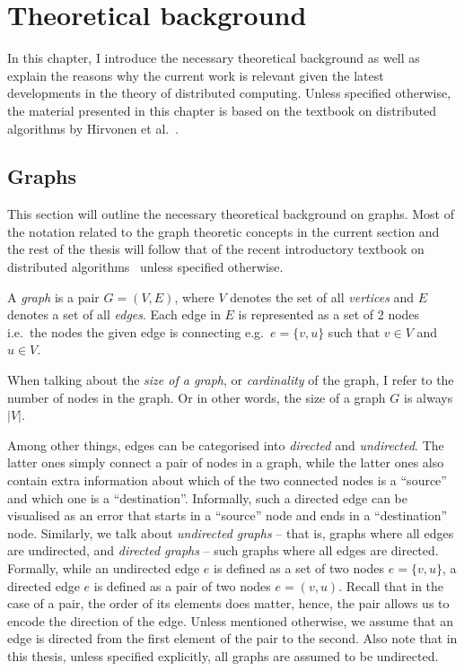 \chapter{Theoretical background}
\label{chapter:background}

In this chapter, I introduce the necessary theoretical background as well as
explain the reasons why the current work is relevant given the latest
developments in the theory of distributed computing. Unless specified otherwise,
the material presented in this chapter is based on the textbook on distributed algorithms by Hirvonen et al.~\cite{Hirvonen2020}.

\section{Graphs}

This section will outline the necessary theoretical background on graphs. 
Most of the notation related to the graph theoretic concepts in the current
section and the rest of the thesis will follow that of
the recent introductory textbook on distributed algorithms~\cite{Hirvonen2020}
unless specified otherwise.

A \emph{graph} is a pair $G = (V, E)$, where $V$ denotes the set of all \emph{vertices}
and $E$ denotes a set of all \emph{edges}. Each edge in $E$ is represented as a set of
2 nodes i.e.\ the nodes the given edge is connecting e.g.\ $e = \{v, u\}$ such that 
$v \in V$ and $u \in V$.

When talking about the \emph{size of a graph}, or \emph{cardinality} of the graph, I refer
to the number of nodes in the graph. Or in other words, the size of a graph $G$
is always $|V|$.

Among other things, edges can be categorised into \emph{directed} and \emph{undirected}.
The latter ones simply connect a pair of nodes in a graph, while the latter
ones also contain extra information about which of the two connected nodes is
a ``source'' and which one is a ``destination''. Informally, such a directed edge
can be visualised as an error that starts in a ``source'' node and ends in a 
``destination'' node.  Similarly, we talk about \emph{undirected graphs} -- that is, graphs
where all edges are undirected, and \emph{directed graphs} -- such graphs where all
edges are directed. Formally, while an undirected edge $e$ is defined as a
set of two nodes $e = \{v, u\}$, a directed edge $e$ is defined as a pair
of two nodes $e = (v, u)$. Recall that in the case of a pair, the order of its
elements does matter, hence, the pair allows us to encode the direction of
the edge. Unless mentioned otherwise, we assume that an edge is directed
from the first element of the pair to the second. Also note that in this
thesis, unless specified explicitly, all graphs are assumed to be undirected.

